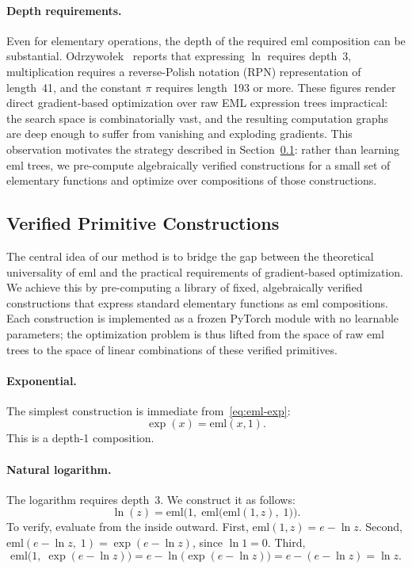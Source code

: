 \paragraph{Depth requirements.}
Even for elementary operations, the depth of the required $\mathrm{eml}$ composition
can be substantial.  Odrzywo{\l}ek~\cite{odrzywołek2026} reports that expressing
$\ln$ requires depth~3, multiplication requires a reverse-Polish notation (RPN)
representation of length~41, and the constant $\pi$ requires length~193 or more.
These figures render direct gradient-based optimization over raw EML expression
trees impractical: the search space is combinatorially vast, and the resulting
computation graphs are deep enough to suffer from vanishing and exploding
gradients.  This observation motivates the strategy described in
Section~\ref{sec:primitives}: rather than learning $\mathrm{eml}$ trees, we
pre-compute algebraically verified constructions for a small set of elementary
functions and optimize over compositions of those constructions.

\subsection{Verified Primitive Constructions}
\label{sec:primitives}

The central idea of our method is to bridge the gap between the theoretical
universality of $\mathrm{eml}$ and the practical requirements of gradient-based
optimization.  We achieve this by pre-computing a library of fixed,
algebraically verified constructions that express standard elementary functions
as $\mathrm{eml}$ compositions.  Each construction is implemented as a frozen
PyTorch module with no learnable parameters; the optimization problem is thus
lifted from the space of raw $\mathrm{eml}$ trees to the space of linear
combinations of these verified primitives.

\paragraph{Exponential.}
The simplest construction is immediate from~\eqref{eq:eml-exp}:
\begin{equation}
  \exp(x) = \mathrm{eml}(x, 1).
  \label{eq:prim-exp}
\end{equation}
This is a depth-1 composition.

\paragraph{Natural logarithm.}
The logarithm requires depth~3.  We construct it as follows:
\begin{equation}
  \ln(z) = \mathrm{eml}\!\Big(1,\;\mathrm{eml}\!\big(\mathrm{eml}(1,z),\;1\big)\Big).
  \label{eq:prim-ln}
\end{equation}
To verify, evaluate from the inside outward.  First,
$\mathrm{eml}(1, z) = e - \ln z$.  Second,
$\mathrm{eml}(e - \ln z,\; 1) = \exp(e - \ln z)$, since $\ln 1 = 0$.
Third,
\[
  \mathrm{eml}\!\big(1,\; \exp(e - \ln z)\big)
  = e - \ln\!\big(\exp(e - \ln z)\big)
  = e - (e - \ln z)
  = \ln z.
\]

